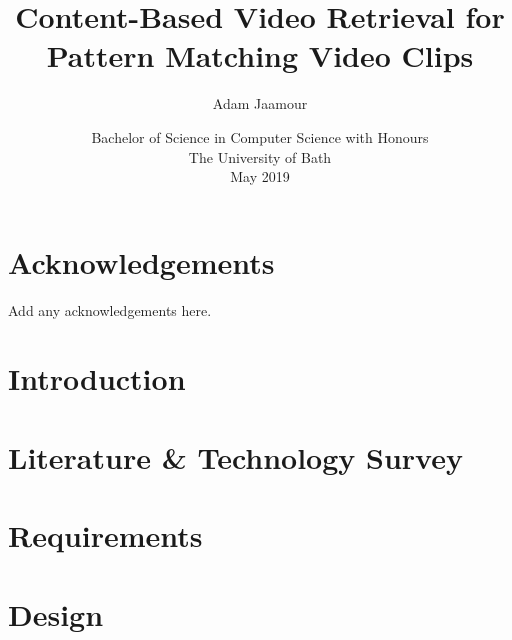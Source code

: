\documentclass[11pt,openright,twoside,a4paper]{report}
\title{Content-Based Video Retrieval for Pattern Matching Video Clips}
\author{Adam Jaamour}
\date{Bachelor of Science in Computer Science with Honours\\The University of Bath\\May 2019}
\begin{document}
\setcounter{page}{0}

\maketitle
\newpage

\newpage

\newpage

\abstract

\newpage

\setcounter{tocdepth}{3}
\tableofcontents
\newpage
\listoffigures
\newpage
\listoftables
\newpage

\chapter*{Acknowledgements}
Add any acknowledgements here.
\newpage


\setcounter{page}{1}

\chapter{Introduction}
\label{ch:chapter1}


\chapter{Literature \& Technology Survey}
\label{ch:chapter2}


\chapter{Requirements}
\label{ch:chapter3}


\chapter{Design}
\label{ch:chapter4}

\end{document}
